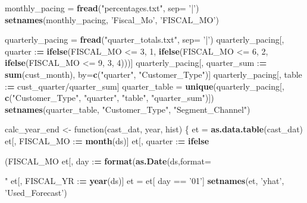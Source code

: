 \documentclass[]{article}
\newenvironment{Shaded}{\begin{snugshade}}{\end{snugshade}}
\newcommand{\KeywordTok}[1]{\textcolor[rgb]{0.13,0.29,0.53}{\textbf{{#1}}}}
\newcommand{\DataTypeTok}[1]{\textcolor[rgb]{0.13,0.29,0.53}{{#1}}}
\newcommand{\DecValTok}[1]{\textcolor[rgb]{0.00,0.00,0.81}{{#1}}}
\newcommand{\StringTok}[1]{\textcolor[rgb]{0.31,0.60,0.02}{{#1}}}
\newcommand{\ErrorTok}[1]{\textcolor[rgb]{0.64,0.00,0.00}{\textbf{{#1}}}}
\newcommand{\NormalTok}[1]{{#1}}
\begin{document}
\begin{Shaded}
\begin{Highlighting}[]
\NormalTok{monthly_pacing =}\StringTok{ }\KeywordTok{fread}\NormalTok{(}\StringTok{"percentages.txt"}\NormalTok{, }\DataTypeTok{sep=} \StringTok{'|'}\NormalTok{)}
\KeywordTok{setnames}\NormalTok{(monthly_pacing, }\StringTok{'Fiscal_Mo'}\NormalTok{, }\StringTok{'FISCAL_MO'}\NormalTok{)}



\NormalTok{quarterly_pacing =}\StringTok{ }\KeywordTok{fread}\NormalTok{(}\StringTok{"quarter_totals.txt"}\NormalTok{, }\DataTypeTok{sep=} \StringTok{'|'}\NormalTok{)}
\NormalTok{quarterly_pacing[, quarter :}\ErrorTok{=}\StringTok{ }\KeywordTok{ifelse}\NormalTok{(FISCAL_MO <=}\StringTok{ }\DecValTok{3}\NormalTok{, }\DecValTok{1}\NormalTok{, }\KeywordTok{ifelse}\NormalTok{(FISCAL_MO <=}\StringTok{ }\DecValTok{6}\NormalTok{, }\DecValTok{2}\NormalTok{, }\KeywordTok{ifelse}\NormalTok{(FISCAL_MO <=}\StringTok{ }\DecValTok{9}\NormalTok{, }\DecValTok{3}\NormalTok{, }\DecValTok{4}\NormalTok{)))]}
\NormalTok{quarterly_pacing[, quarter_sum :}\ErrorTok{=}\StringTok{ }\KeywordTok{sum}\NormalTok{(cust_month), by=}\KeywordTok{c}\NormalTok{(}\StringTok{"quarter"}\NormalTok{, }\StringTok{"Customer_Type"}\NormalTok{)]}
\NormalTok{quarterly_pacing[, table :}\ErrorTok{=}\StringTok{ }\NormalTok{cust_quarter/quarter_sum]}
\NormalTok{quarter_table =}\StringTok{ }\KeywordTok{unique}\NormalTok{(quarterly_pacing[, }\KeywordTok{c}\NormalTok{(}\StringTok{"Customer_Type"}\NormalTok{, }\StringTok{"quarter"}\NormalTok{, }\StringTok{"table"}\NormalTok{, }\StringTok{"quarter_sum"}\NormalTok{)])}
\KeywordTok{setnames}\NormalTok{(quarter_table, }\StringTok{"Customer_Type"}\NormalTok{, }\StringTok{"Segment_Channel"}\NormalTok{)}


\NormalTok{calc_year_end <-}\StringTok{ }\NormalTok{function(cast_dat, year, hist) \{}
  \NormalTok{et =}\StringTok{ }\KeywordTok{as.data.table}\NormalTok{(cast_dat)}
  \NormalTok{et[, FISCAL_MO :}\ErrorTok{=}\StringTok{ }\KeywordTok{month}\NormalTok{(ds)]}
  \NormalTok{et[, quarter :}\ErrorTok{=}\StringTok{ }\KeywordTok{ifelse}\NormalTok{(FISCAL_MO %in%}\StringTok{ }\KeywordTok{c}\NormalTok{(}\DecValTok{1}\NormalTok{,}\DecValTok{2}\NormalTok{,}\DecValTok{3}\NormalTok{), }\DecValTok{1}\NormalTok{, }\KeywordTok{ifelse}\NormalTok{(FISCAL_MO %in%}\StringTok{ }\KeywordTok{c}\NormalTok{(}\DecValTok{4}\NormalTok{,}\DecValTok{5}\NormalTok{,}\DecValTok{6}\NormalTok{), }\DecValTok{2}\NormalTok{, }\KeywordTok{ifelse}\NormalTok{(FISCAL_MO %in%}\StringTok{ }\KeywordTok{c}\NormalTok{(}\DecValTok{7}\NormalTok{,}\DecValTok{8}\NormalTok{,}\DecValTok{9}\NormalTok{), }\DecValTok{3}\NormalTok{,}\DecValTok{4}\NormalTok{)))]}
  \NormalTok{et[, day :}\ErrorTok{=}\StringTok{ }\KeywordTok{format}\NormalTok{(}\KeywordTok{as.Date}\NormalTok{(ds,}\DataTypeTok{format=}\StringTok{"%Y-%m-%d"}\NormalTok{), }\StringTok{"%d"}\NormalTok{)]}
  \NormalTok{et[, FISCAL_YR :}\ErrorTok{=}\StringTok{ }\KeywordTok{year}\NormalTok{(ds)]}
  \NormalTok{et =}\StringTok{ }\NormalTok{et[ day ==}\StringTok{ '01'}\NormalTok{]}
  \KeywordTok{setnames}\NormalTok{(et, }\StringTok{'yhat'}\NormalTok{, }\StringTok{'Used_Forecast'}\NormalTok{)}
  
}}
\end{Highlighting}
\end{Shaded}
\end{document}
